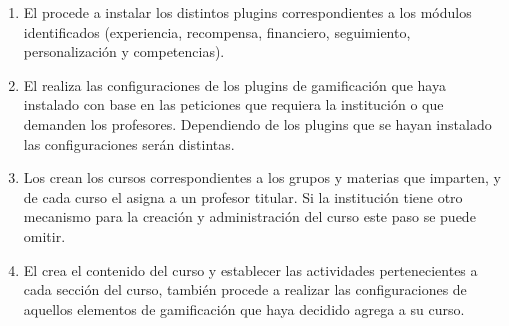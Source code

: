  \begin{enumerate}



  \item El  procede a instalar los distintos plugins
        correspondientes a los módulos identificados (experiencia, recompensa,
        financiero, seguimiento, personalización y competencias).

  \item El  realiza las configuraciones de los plugins
        de gamificación que haya instalado con base en las peticiones que requiera
        la institución o que demanden los profesores. Dependiendo de los plugins
        que se hayan instalado las configuraciones serán distintas.

  \item Los  crean los cursos correspondientes a
        los grupos y materias que imparten, y de cada curso el  asigna a un profesor titular. Si la institución tiene
        otro mecanismo para la creación y administración del curso este paso se
        puede omitir.

  \item El  crea el contenido del curso y establecer las
        actividades pertenecientes a cada sección del curso, también procede
        a realizar las configuraciones de aquellos elementos de gamificación
        que haya decidido agrega a su curso.


\end{enumerate}
